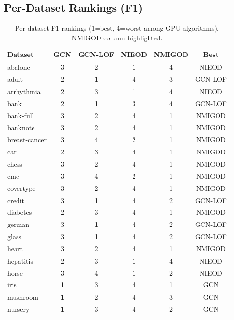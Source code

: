 \documentclass[11pt,a4paper]{article}
\begin{document}
\subsection{Per-Dataset Rankings (F1)}
\begin{table}[H]\centering\caption{Per-dataset F1 rankings (1=best, 4=worst among GPU algorithms). NMIGOD column highlighted.}\label{tab:ranks}\small
\begin{tabular}{lcccc|c}
\toprule
Dataset & GCN & GCN-LOF & NIEOD & NMIGOD & Best \\
\midrule
abalone & 3 & 2 & \textbf{1} & \cellcolor{red!10}4 & NIEOD \\
adult & 2 & \textbf{1} & 4 & \cellcolor{red!10}3 & GCN-LOF \\
arrhythmia & 2 & 3 & \textbf{1} & \cellcolor{red!10}4 & NIEOD \\
bank & 2 & \textbf{1} & 3 & \cellcolor{red!10}4 & GCN-LOF \\
bank-full & 3 & 2 & 4 & \cellcolor{red!10}1 & NMIGOD \\
banknote & 3 & 2 & 4 & \cellcolor{red!10}1 & NMIGOD \\
breast-cancer & 3 & 4 & 2 & \cellcolor{red!10}1 & NMIGOD \\
car & 2 & 3 & 4 & \cellcolor{red!10}1 & NMIGOD \\
chess & 3 & 2 & 4 & \cellcolor{red!10}1 & NMIGOD \\
cmc & 3 & 4 & 2 & \cellcolor{red!10}1 & NMIGOD \\
covertype & 3 & 2 & 4 & \cellcolor{red!10}1 & NMIGOD \\
credit & 3 & \textbf{1} & 4 & \cellcolor{red!10}2 & GCN-LOF \\
diabetes & 2 & 3 & 4 & \cellcolor{red!10}1 & NMIGOD \\
german & 3 & \textbf{1} & 4 & \cellcolor{red!10}2 & GCN-LOF \\
glass & 3 & \textbf{1} & 4 & \cellcolor{red!10}2 & GCN-LOF \\
heart & 3 & 2 & 4 & \cellcolor{red!10}1 & NMIGOD \\
hepatitis & 2 & 3 & \textbf{1} & \cellcolor{red!10}4 & NIEOD \\
horse & 3 & 4 & \textbf{1} & \cellcolor{red!10}2 & NIEOD \\
iris & \textbf{1} & 3 & 4 & \cellcolor{red!10}1 & GCN \\
mushroom & \textbf{1} & 2 & 4 & \cellcolor{red!10}3 & GCN \\
nursery & \textbf{1} & 3 & 4 & \cellcolor{red!10}2 & GCN \\

\end{tabular}
\end{table}
\end{document}

